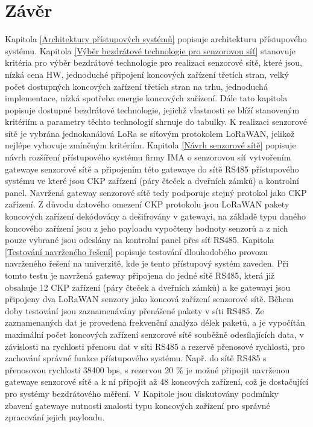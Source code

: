 \chapter{Závěr}
%
Kapitola \ref{Architektury přístupových systémů} popisuje architekturu přístupového systému.
%
Kapitola \ref{Výběr bezdrátové technologie pro senzorovou síť} stanovuje kritéria pro výběr bezdrátové technologie pro realizaci senzorové sítě, které jsou, nízká cena HW, jednoduché připojení  koncových zařízení třetích stran, velký počet dostupných koncových zařízení třetích stran na trhu, jednoduchá implementace, nízká spotřeba energie koncových zařízení.
Dále tato kapitola popisuje dostupné bezdrátové technologie, jejichž vlastnosti se blíží stanoveným kritériím a parametry těchto technologií shrnuje do tabulky. 
K realizaci senzorové sítě je vybrána jednokanálová LoRa se síťovým protokolem LoRaWAN, jelikož nejlépe vyhovuje zmíněným kritériím.
%
Kapitola \ref{Návrh senzorové sítě} popisuje návrh rozšíření přístupového systému firmy IMA o senzorovou síť vytvořením gatewaye senzorové sítě a připojením této gatewaye do sítě RS485 přístupového systému ve které jsou CKP zařízení (páry čteček a dveřních zámků) a kontrolní panel. Navržená gateway senzorové sítě tedy podporuje stejný protokol jako CKP zařízení.
Z důvodu datového omezení CKP protokolu jsou LoRaWAN pakety koncových zařízení dekódovány a dešifrovány v gatewayi, na základě typu daného koncového zařízení jsou z jeho payloadu vypočteny hodnoty senzorů a z nich pouze vybrané jsou odeslány na kontrolní panel přes síť RS485.
%
Kapitola \ref{Testování navrženého řešení} popisuje testování dlouhodobého provozu navrženého řešení na univerzitě, kde je tento přístupový systém zaveden. 
Při tomto testu je navržená gateway připojena do jedné sítě RS485, která již obsahuje 12 CKP zařízení (páry čteček a dveřních zámků) a ke gatewayi jsou připojeny dva LoRaWAN senzory jako koncová zařízení senzorové sítě.
Během doby testování jsou zaznamenávány přenášené pakety v síti RS485.
Ze zaznamenaných dat je provedena frekvenční analýza délek paketů, a je vypočítán maximální počet koncových zařízení senzorové sítě souběžně odesílajících data, v závislosti na rychlosti přenosu dat v síti RS485 a rezervě přenosové rychlosti, pro zachování správné funkce přístupového systému.
Např. do sítě RS485 s přenosovou rychlostí 38400 bps, s rezervou 20 \% je možné připojit navrženou gatewaye senzorové sítě a k ní připojit až 48 koncových zařízení, což je dostačující pro systémy bezdrátového měření.
%
V Kapitole \label{Návrh vylepšení systému} jsou diskutovány podmínky zbavení gatewaye nutnosti znalosti typu koncových zařízení pro správné zpracování jejich payloadu. 
